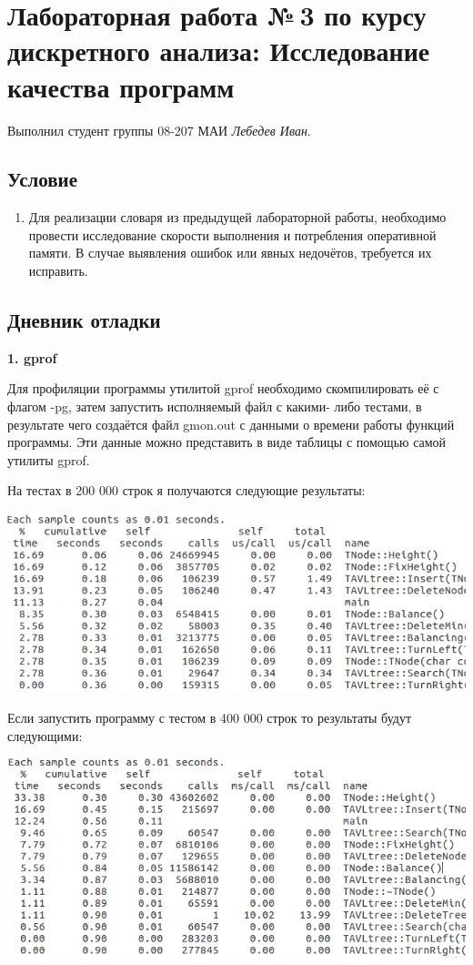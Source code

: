 \documentclass[12pt]{article}
\begin{document}
\section*{Лабораторная работа №\,3 по курсу дискретного анализа: Исследование качества программ}

Выполнил студент группы 08-207 МАИ \textit{Лебедев Иван}.

\subsection*{Условие}

\begin{enumerate}
\item Для реализации словаря из предыдущей лабораторной работы, необходимо провести исследование скорости выполнения и потребления оперативной памяти. В случае выявления ошибок или явных недочётов, требуется их исправить.

\end{enumerate}

\subsection*{Дневник отладки}

\par \textbf{1. gprof}
\par Для профиляции программы утилитой gprof необходимо скомпилировать её с флагом -pg, затем запустить исполняемый файл с какими- либо тестами, в результате чего создаётся файл gmon.out с данными о времени работы функций программы. Эти данные можно представить в виде таблицы с помощью самой утилиты gprof.
\par На тестах в 200 000 строк я получаются следующие результаты: 

\noindent \includegraphics{200k}

Если запустить программу с тестом в 400 000 строк то результаты будут следующими:

\noindent \includegraphics{400k}
\end{document}
